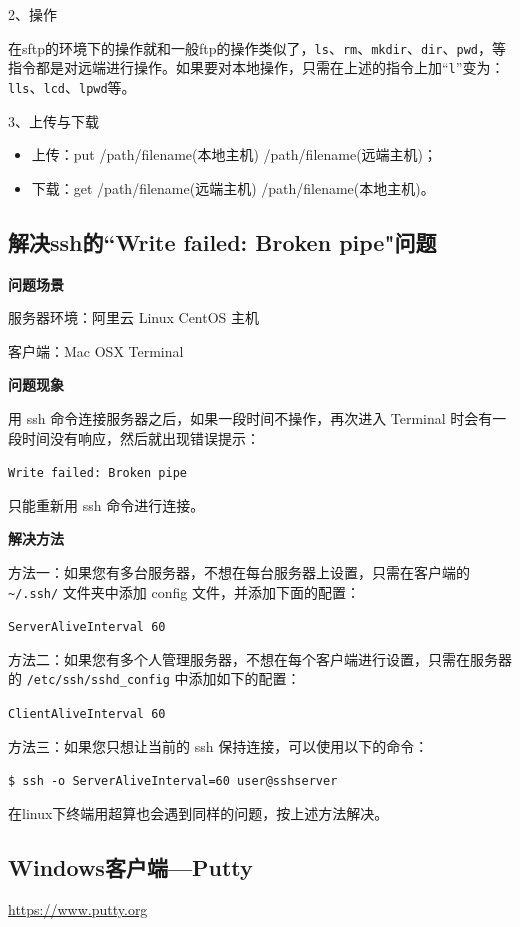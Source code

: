 {2、操作

在sftp的环境下的操作就和一般ftp的操作类似了，\verb|ls|、\verb|rm|、\verb|mkdir|、\verb|dir|、\verb|pwd|，等指令都是对远端进行操作。如果要对本地操作，只需在上述的指令上加“\verb|l|”变为：\verb|lls|、\verb|lcd|、\verb|lpwd|等。

3、上传与下载

\begin{itemize}
\item 上传：put /path/filename(本地主机) /path/filename(远端主机)；
\item 下载：get /path/filename(远端主机) /path/filename(本地主机)。
\end{itemize}



\subsection{解决ssh的``Write failed: Broken pipe"问题}

\textbf{问题场景}

服务器环境：阿里云 Linux CentOS 主机

客户端：Mac OSX Terminal

\textbf{问题现象}

用 ssh 命令连接服务器之后，如果一段时间不操作，再次进入 Terminal 时会有一段时间没有响应，然后就出现错误提示：

\verb|Write failed: Broken pipe|

只能重新用 ssh 命令进行连接。

\textbf{解决方法}

方法一：如果您有多台服务器，不想在每台服务器上设置，只需在客户端的 \verb*|~/.ssh/| 文件夹中添加 config 文件，并添加下面的配置：

\verb*|ServerAliveInterval 60|

方法二：如果您有多个人管理服务器，不想在每个客户端进行设置，只需在服务器的 \verb*|/etc/ssh/sshd_config| 中添加如下的配置：

\verb*|ClientAliveInterval 60|

方法三：如果您只想让当前的 ssh 保持连接，可以使用以下的命令：

\verb*|$ ssh -o ServerAliveInterval=60 user@sshserver|


在linux下终端用超算也会遇到同样的问题，按上述方法解决。


\subsection{Windows客户端—Putty}
\url{https://www.putty.org}

}
